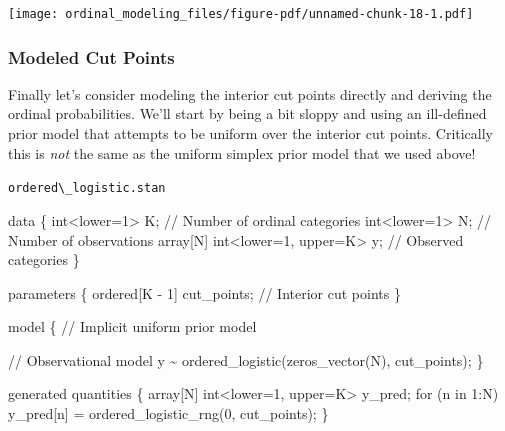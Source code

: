 \documentclass[
  letterpaper,
  DIV=11,
  numbers=noendperiod]{scrartcl}
\newenvironment{Shaded}{\begin{snugshade}}{\end{snugshade}}
\newcommand{\CommentTok}[1]{\textcolor[rgb]{0.37,0.37,0.37}{#1}}
\newcommand{\ControlFlowTok}[1]{\textcolor[rgb]{0.00,0.23,0.31}{#1}}
\newcommand{\DataTypeTok}[1]{\textcolor[rgb]{0.68,0.00,0.00}{#1}}
\newcommand{\DecValTok}[1]{\textcolor[rgb]{0.68,0.00,0.00}{#1}}
\newcommand{\KeywordTok}[1]{\textcolor[rgb]{0.00,0.23,0.31}{#1}}
\newcommand{\NormalTok}[1]{\textcolor[rgb]{0.00,0.23,0.31}{#1}}
\begin{document}
\texttt{[image: ordinal\_modeling\_files/figure-pdf/unnamed-chunk-18-1.pdf]}

\subsubsection{Modeled Cut Points}\label{modeled-cut-points}

Finally let's consider modeling the interior cut points directly and
deriving the ordinal probabilities. We'll start by being a bit sloppy
and using an ill-defined prior model that attempts to be uniform over
the interior cut points. Critically this is \emph{not} the same as the
uniform simplex prior model that we used above!

\begin{codelisting}

\caption{\texttt{ordered\textbackslash\_logistic.stan}}

\begin{Shaded}
\begin{Highlighting}[]
\KeywordTok{data}\NormalTok{ \{}
  \DataTypeTok{int}\NormalTok{\textless{}}\KeywordTok{lower}\NormalTok{=}\DecValTok{1}\NormalTok{\textgreater{} K;                   }\CommentTok{// Number of ordinal categories}
  \DataTypeTok{int}\NormalTok{\textless{}}\KeywordTok{lower}\NormalTok{=}\DecValTok{1}\NormalTok{\textgreater{} N;                   }\CommentTok{// Number of observations}
  \DataTypeTok{array}\NormalTok{[N] }\DataTypeTok{int}\NormalTok{\textless{}}\KeywordTok{lower}\NormalTok{=}\DecValTok{1}\NormalTok{, }\KeywordTok{upper}\NormalTok{=K\textgreater{} y; }\CommentTok{// Observed categories}
\NormalTok{\}}

\KeywordTok{parameters}\NormalTok{ \{}
  \DataTypeTok{ordered}\NormalTok{[K {-} }\DecValTok{1}\NormalTok{] cut\_points; }\CommentTok{// Interior cut points}
\NormalTok{\}}

\KeywordTok{model}\NormalTok{ \{}
  \CommentTok{// Implicit uniform prior model}

  \CommentTok{// Observational model}
\NormalTok{  y \textasciitilde{} ordered\_logistic(zeros\_vector(N), cut\_points);}
\NormalTok{\}}

\KeywordTok{generated quantities}\NormalTok{ \{}
  \DataTypeTok{array}\NormalTok{[N] }\DataTypeTok{int}\NormalTok{\textless{}}\KeywordTok{lower}\NormalTok{=}\DecValTok{1}\NormalTok{, }\KeywordTok{upper}\NormalTok{=K\textgreater{} y\_pred;}
  \ControlFlowTok{for}\NormalTok{ (n }\ControlFlowTok{in} \DecValTok{1}\NormalTok{:N)}
\NormalTok{    y\_pred[n] = ordered\_logistic\_rng(}\DecValTok{0}\NormalTok{, cut\_points);}
\NormalTok{\}}
\end{Highlighting}
\end{Shaded}

\end{codelisting}
\end{document}

